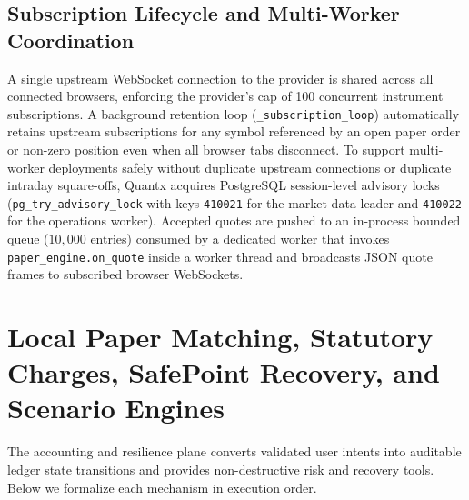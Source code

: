 \documentclass[journal,onecolumn,10pt]{IEEEtran}
\begin{document}
\subsection{Subscription Lifecycle and Multi-Worker Coordination}
A single upstream WebSocket connection to the provider is shared across all connected browsers, enforcing the provider's cap of 100 concurrent instrument subscriptions. A background retention loop (\texttt{\_subscription\_loop}) automatically retains upstream subscriptions for any symbol referenced by an open paper order or non-zero position even when all browser tabs disconnect. To support multi-worker deployments safely without duplicate upstream connections or duplicate intraday square-offs, Quantx acquires PostgreSQL session-level advisory locks (\texttt{pg\_try\_advisory\_lock} with keys \texttt{410021} for the market-data leader and \texttt{410022} for the operations worker). Accepted quotes are pushed to an in-process bounded queue ($10{,}000$ entries) consumed by a dedicated worker that invokes \texttt{paper\_engine.on\_quote} inside a worker thread and broadcasts JSON quote frames to subscribed browser WebSockets.

\section{Local Paper Matching, Statutory Charges, SafePoint Recovery, and Scenario Engines}

The accounting and resilience plane converts validated user intents into auditable ledger state transitions and provides non-destructive risk and recovery tools. Below we formalize each mechanism in execution order.
\end{document}
